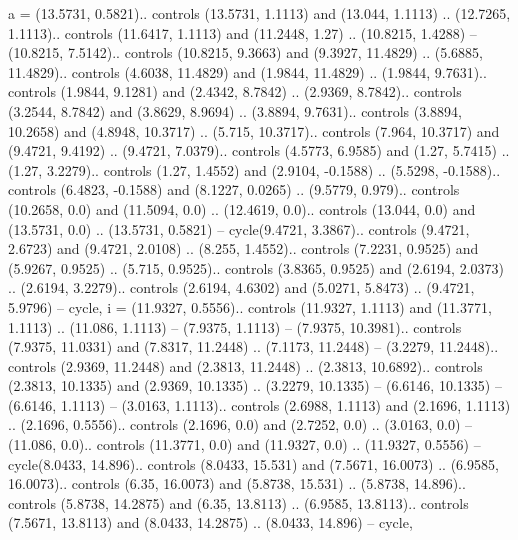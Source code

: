 a = {(13.5731, 0.5821).. controls (13.5731, 1.1113) and (13.044, 1.1113) .. (12.7265, 1.1113).. controls (11.6417, 1.1113) and (11.2448, 1.27) .. (10.8215, 1.4288) -- (10.8215, 7.5142).. controls (10.8215, 9.3663) and (9.3927, 11.4829) .. (5.6885, 11.4829).. controls (4.6038, 11.4829) and (1.9844, 11.4829) .. (1.9844, 9.7631).. controls (1.9844, 9.1281) and (2.4342, 8.7842) .. (2.9369, 8.7842).. controls (3.2544, 8.7842) and (3.8629, 8.9694) .. (3.8894, 9.7631).. controls (3.8894, 10.2658) and (4.8948, 10.3717) .. (5.715, 10.3717).. controls (7.964, 10.3717) and (9.4721, 9.4192) .. (9.4721, 7.0379).. controls (4.5773, 6.9585) and (1.27, 5.7415) .. (1.27, 3.2279).. controls (1.27, 1.4552) and (2.9104, -0.1588) .. (5.5298, -0.1588).. controls (6.4823, -0.1588) and (8.1227, 0.0265) .. (9.5779, 0.979).. controls (10.2658, 0.0) and (11.5094, 0.0) .. (12.4619, 0.0).. controls (13.044, 0.0) and (13.5731, 0.0) .. (13.5731, 0.5821) -- cycle(9.4721, 3.3867).. controls (9.4721, 2.6723) and (9.4721, 2.0108) .. (8.255, 1.4552).. controls (7.2231, 0.9525) and (5.9267, 0.9525) .. (5.715, 0.9525).. controls (3.8365, 0.9525) and (2.6194, 2.0373) .. (2.6194, 3.2279).. controls (2.6194, 4.6302) and (5.0271, 5.8473) .. (9.4721, 5.9796) -- cycle},
i = {(11.9327, 0.5556).. controls (11.9327, 1.1113) and (11.3771, 1.1113) .. (11.086, 1.1113) -- (7.9375, 1.1113) -- (7.9375, 10.3981).. controls (7.9375, 11.0331) and (7.8317, 11.2448) .. (7.1173, 11.2448) -- (3.2279, 11.2448).. controls (2.9369, 11.2448) and (2.3813, 11.2448) .. (2.3813, 10.6892).. controls (2.3813, 10.1335) and (2.9369, 10.1335) .. (3.2279, 10.1335) -- (6.6146, 10.1335) -- (6.6146, 1.1113) -- (3.0163, 1.1113).. controls (2.6988, 1.1113) and (2.1696, 1.1113) .. (2.1696, 0.5556).. controls (2.1696, 0.0) and (2.7252, 0.0) .. (3.0163, 0.0) -- (11.086, 0.0).. controls (11.3771, 0.0) and (11.9327, 0.0) .. (11.9327, 0.5556) -- cycle(8.0433, 14.896).. controls (8.0433, 15.531) and (7.5671, 16.0073) .. (6.9585, 16.0073).. controls (6.35, 16.0073) and (5.8738, 15.531) .. (5.8738, 14.896).. controls (5.8738, 14.2875) and (6.35, 13.8113) .. (6.9585, 13.8113).. controls (7.5671, 13.8113) and (8.0433, 14.2875) .. (8.0433, 14.896) -- cycle},
